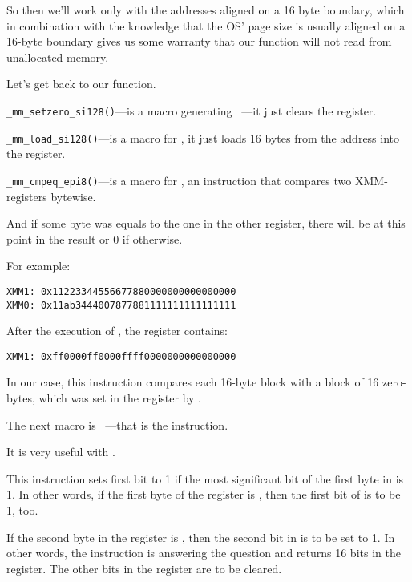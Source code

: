 So then we'll work only with the addresses aligned on a 16 byte boundary, which in combination with the knowledge
that the \ac{OS}' page size is usually aligned on a 16-byte boundary gives us some warranty that our function will not
read from unallocated memory.

Let's get back to our function.

\verb|_mm_setzero_si128()|---is a macro generating ~---it just clears the  register.

\verb|_mm_load_si128()|---is a macro for \MOVDQA, it just loads 16 bytes from the address into the  register.

\verb|_mm_cmpeq_epi8()|---is a macro for \PCMPEQB, an instruction that compares two XMM-registers bytewise.

And if some byte was equals to the one in the other register, 
there will be  at this point in the result or 0 if otherwise.

For example:

\begin{verbatim}
XMM1: 0x11223344556677880000000000000000
XMM0: 0x11ab3444007877881111111111111111
\end{verbatim}

After the execution of , the  register contains:

\begin{verbatim}
XMM1: 0xff0000ff0000ffff0000000000000000
\end{verbatim}

In our case, this instruction compares each 16-byte block with a block of 16 zero-bytes,
which was set in the  register by .


The next macro is ~---that is the  instruction.

It is very useful with \PCMPEQB.


This instruction sets first \EAX bit to 1 if the most significant bit of the first byte in  is 1.
In other words, if the first byte of the  register is , then the first bit of \EAX is to be 1, too.

If the second byte in the  register is , then the second bit in \EAX is to be set to 1.
In other words, the instruction is answering the question 
and returns 16 bits in the \EAX register. 
The other bits in the \EAX register are to be cleared.

